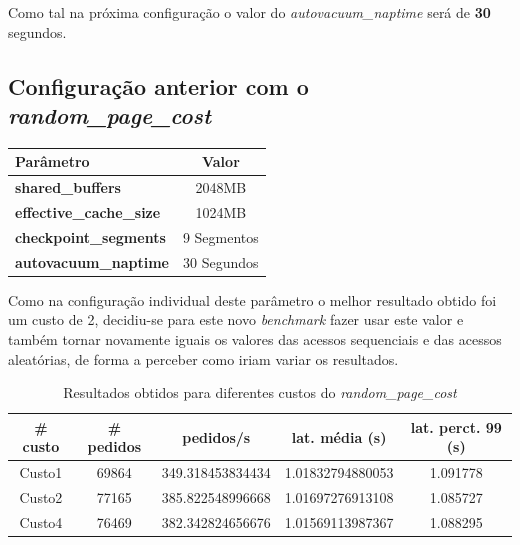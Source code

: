 Como tal na próxima configuração o valor do \textit{autovacuum\_naptime} será de \textbf{30} segundos.

\newpage

\subsection{Configuração anterior com o \textit{random\_page\_cost}}

\begin{table}[!h]
\center
\small
\begin{tabular}{|l|c|}
\hline
\textbf{Parâmetro} & \textbf{Valor} \\ \hline
\textbf{shared\_buffers} & 2048MB  \\ \hline
\textbf{effective\_cache\_size} & 1024MB  \\ \hline
\textbf{checkpoint\_segments} & 9 Segmentos \\ \hline
\textbf{autovacuum\_naptime} & 30 Segundos \\ \hline
\end{tabular}
\end{table}

Como na configuração individual deste parâmetro o melhor resultado obtido foi um custo de 2, decidiu-se para este novo \textit{benchmark} fazer usar este valor e também tornar novamente iguais os valores das acessos sequenciais e das acessos aleatórias, de forma a perceber como iriam variar os resultados.

\begin{table}[!h]
\center
\small
\begin{tabular}{|c|c|c|c|c|}
\hline
\textbf{\# custo} & \textbf{\# pedidos} & \textbf{pedidos/s} & \textbf{lat. média (s)} & \textbf{lat. perct. 99 (s)}  \\ \hline
Custo1 & 69864 & 349.318453834434 & 1.01832794880053 & 1.091778  \\ \hline
Custo2 & 77165 & 385.822548996668 & 1.01697276913108 & 1.085727  \\ \hline
Custo4 & 76469 & 382.342824656676 & 1.01569113987367 & 1.088295  \\ \hline
\end{tabular}
\caption{Resultados obtidos para diferentes custos do \textit{random\_page\_cost}}
\end{table}

